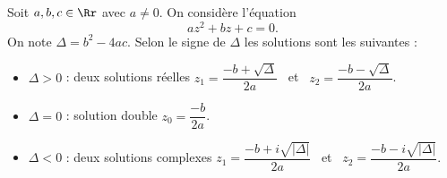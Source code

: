 \documentclass[11pt,class=report,crop=false]{standalone}
\begin{document}
\begin{cours}


Soit $a,b,c \in \Rr$ avec $a \neq 0$. On considère l'équation 
$$az^2+bz+c=0.$$
On note $\Delta = b^2-4ac$. Selon le signe de $\Delta$ les solutions sont les suivantes :
\begin{itemize}
  \item $\Delta > 0$ : deux solutions réelles \quad $z_1 = \dfrac{-b+\sqrt{\Delta}}{2a}$  \  et \  $z_2 = \dfrac{-b-\sqrt{\Delta}}{2a}$.
  \item $\Delta = 0$ : solution double \quad $z_0 = \dfrac{-b}{2a}$.
  \item $\Delta < 0$ : deux solutions complexes \quad $z_1 = \dfrac{-b+i\sqrt{|\Delta|}}{2a}$ \  et \  $z_2 = \dfrac{-b-i\sqrt{|\Delta|}}{2a}$.
\end{itemize}
\end{cours}

\end{document}
